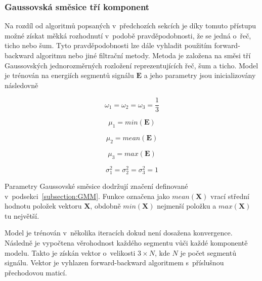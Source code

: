 \subsubsection{Gaussovská směsice tří komponent}
\label{subsection:VAD_GMM}
Na rozdíl od algoritmů popsaných v~předchozích sekcích je díky tomuto přístupu možné získat měkká rozhodnutí v~podobě pravděpodobnosti, že se jedná o~řeč, ticho nebo šum. Tyto pravděpodobnosti lze dále vyhladit použitím forward-backward algoritmu nebo jiné filtrační metody. Metoda je založena na směsi tří Gaussovských jednorozměrných rozložení reprezentujících řeč, šum a ticho. Model je trénován na energiích segmentů signálu $\mathbf{E}$ a jeho parametry jsou inicializovány následovně
 

\begin{equation}
    \label{eqn:VAD_GMM_weights}
    \omega_{1} = \omega_{2} = \omega_{3} = \frac{1}{3}
\end{equation}

\begin{equation}
    \label{eqn:VAD_GMM_mean1}
    \mu_{1} = min(\mathbf{E})
\end{equation}

\begin{equation}
    \label{eqn:VAD_GMM_mean2}
    \mu_{2} = mean(\mathbf{E})
\end{equation}

\begin{equation}
    \label{eqn:VAD_GMM_mean3}
    \mu_{3} = max(\mathbf{E})
\end{equation}

\begin{equation}
    \label{eqn:VAD_GMM_sigmas}
    \sigma^2_{1} = \sigma^2_{2} = \sigma^2_{3} = 1
\end{equation}

Parametry Gaussovské směsice dodržují značení definované v~podsekci~\ref{subsection:GMM}. Funkce označena jako $mean(\mathbf{X})$ vrací střední hodnotu položek vektoru $\mathbf{X}$, obdobně $min(\mathbf{X})$ nejmenší položku a $max(\mathbf{X})$ tu největší.

Model je trénován v~několika iteracích dokud není dosažena konvergence. Následně je vypočtena věrohodnost každého segmentu vůči každé komponentě modelu. Takto je získán vektor o~velikosti $3 \times N$, kde $N$ je počet segmentů signálu. Vektor je vyhlazen forward-backward algoritmem s~příslušnou přechodovou maticí.


